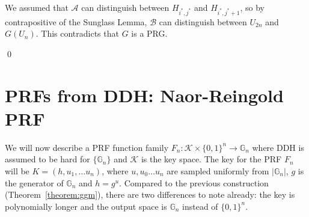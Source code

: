 We assumed that $\mathcal{A}$ can distinguish between $H_{i^*, j^*}$ and $H_{i^*, j^*+1}$, so by contrapositive of the Sunglass Lemma, $\mathcal{B}$ can distinguish between $U_{2n}$ and $G(U_n)$. This contradicts that $G$ is a PRG.

\qed







\section{PRFs from DDH: Naor-Reingold PRF}
We will now describe a PRF function family $F_n: \mathcal{K} \times \{0,1\}^n \rightarrow \mathbb{G}_n$ where DDH is assumed to be hard for  $\{\mathbb{G}_n\}$ and $\mathcal{K}$ is the key space.
The key for the PRF $F_n$ will be $K =  (h, u_1, \ldots u_n)$, where $u,u_0\ldots u_n$ are sampled uniformly from $|\mathbb{G}_n|$, $g$ is the generator of $\mathbb{G}_n$ and $h = g^u$. Compared to the previous construction (Theorem~\ref{theorem:ggm}), there are two differences to note already: the key is polynomially longer and the output space is $\mathbb{G}_n$ instead of $\{0, 1\}^n$.

